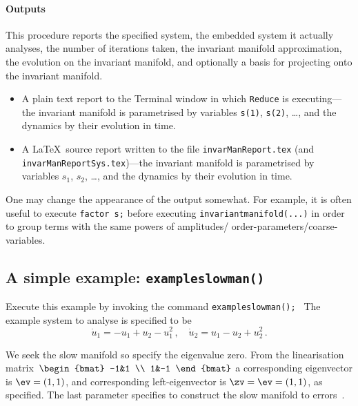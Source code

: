 \documentclass[11pt,a5paper]{article}
\def\eps{\varepsilon}
\begin{document}
\paragraph{Outputs}  This procedure reports the specified
system, the embedded system it actually analyses, the number
of iterations taken, the invariant manifold approximation,
the evolution on the invariant manifold, and optionally a
basis for projecting onto the invariant manifold.
\begin{itemize}
\item A plain text report to the Terminal window in which
\verb|Reduce| is executing---the invariant manifold is parametrised by variables \verb|s(1)|, \verb|s(2)|, \ldots, and the dynamics by their evolution in time.
\item A \LaTeX\ source report written to the file
\verb|invarManReport.tex| (and \verb|invarManReportSys.tex|)---the invariant manifold is parametrised by variables \(s_1\), \(s_2\), \ldots, and the dynamics by their evolution in time.
\end{itemize}
One may change the appearance of the output somewhat. For
example, it is often useful to execute  \verb|factor s;|
before executing \verb|invariantmanifold(...)| in order to group
terms with the same powers of amplitudes\slash
order-parameters\slash coarse-variables.



\subsection{A simple example: \texttt{exampleslowman()}} 
\label{ss:eg}
Execute this example by invoking the command
\verb|exampleslowman(); |
The example system to analyse is specified to be
\begin{equation*}
\dot u_1=-u_1+u_2-u_1^2\,, \quad \dot u_2=u_1-u_2+u_2^2\,.
\end{equation*}
We seek the slow manifold so specify the eigenvalue zero.
From the linearisation matrix~\(\begin{bmat} -1&1 \\ 1&-1 \end{bmat}\) a corresponding eigenvector is \(\ev=(1,1)\), and corresponding left-eigenvector is \(\zv=\ev=(1,1)\), as specified.
The last parameter specifies to construct the slow manifold to errors~\Ord{\eps^5}.
\end{document}
